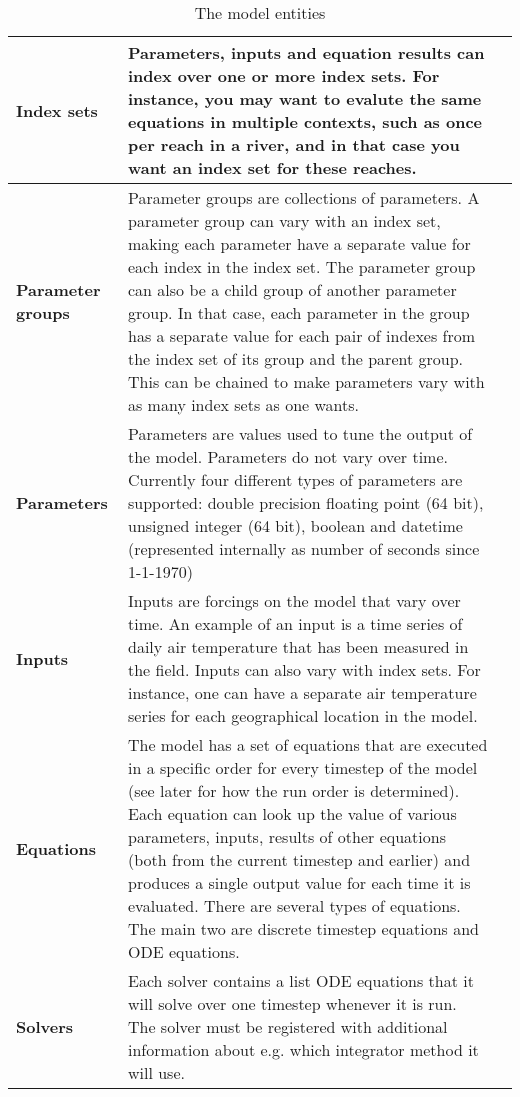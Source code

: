 \documentclass[]{memoir}
\begin{document}
\begin{table}[h]
\label{tab:modelentity}
\begin{tabular}{>{\bfseries}l|p{7cm}l}
\hline
Index sets & Parameters, inputs and equation results can index over one or more index sets. For instance, you may want to evalute the same equations in multiple contexts, such as once per reach in a river, and in that case you want an index set for these reaches. \\
\hline
Parameter groups & Parameter groups are collections of parameters. A parameter group can vary with an index set, making each parameter have a separate value for each index in the index set. The parameter group can also be a child group of another parameter group. In that case, each parameter in the group has a separate value for each pair of indexes from the index set of its group and the parent group. This can be chained to make parameters vary with as many index sets as one wants. \\
\hline
Parameters & Parameters are values used to tune the output of the model. Parameters do not vary over time. Currently four different types of parameters are supported: double precision floating point (64 bit), unsigned integer (64 bit), boolean and datetime (represented internally as number of seconds since 1-1-1970) \\
\hline
Inputs & Inputs are forcings on the model that vary over time. An example of an input is a time series of daily air temperature that has been measured in the field. Inputs can also vary with index sets. For instance, one can have a separate air temperature series for each geographical location in the model.\\
\hline
Equations & The model has a set of equations that are executed in a specific order for every timestep of the model (see later for how the run order is determined). Each equation can look up the value of various parameters, inputs, results of other equations (both from the current timestep and earlier) and produces a single output value for each time it is evaluated. There are several types of equations. The main two are discrete timestep equations and ODE equations. \\
\hline
Solvers & Each solver contains a list ODE equations that it will solve over one timestep whenever it is run. The solver must be registered with additional information about e.g. which integrator method it will use. \\
\hline
\end{tabular}
\caption{The model entities}
\end{table}
\end{document}

